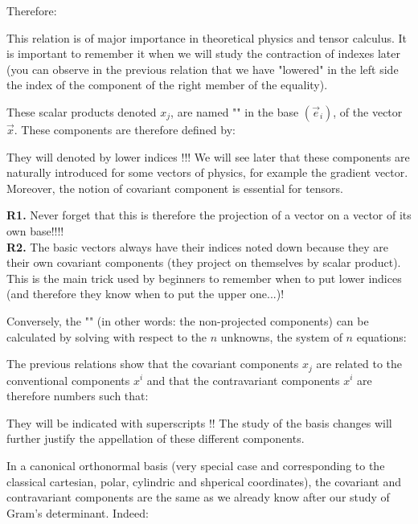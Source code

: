 	Therefore:
	
	This relation is of major importance in theoretical physics and tensor calculus. It is important to remember it when we will study the contraction of indexes later (you can observe in the previous relation that we have "lowered" in the left side the index of the component of the right member of the equality).
	
	These scalar products denoted $x_j$, are named "" in the base $(\vec{e}_i)$, of the vector $\vec{x}$. These components are therefore defined by:
	
	They will denoted by lower indices !!! We will see later that these components are naturally introduced for some vectors of physics, for example the gradient vector. Moreover, the notion of covariant component is essential for tensors.
	
	\begin{tcolorbox}[title=Remarks,colframe=black,arc=10pt]
	\textbf{R1.} Never forget that this is therefore the projection of a vector on a vector of its own base!!!!\\
	
	\textbf{R2.} The basic vectors always have their indices noted down because they are their own covariant components (they project on themselves by scalar product). This is the main trick used by beginners to remember when to put lower indices (and therefore they know when to put the upper one...)!
	\end{tcolorbox}
	Conversely, the "" (in other words: the non-projected components) can be calculated by solving with respect to the $n$ unknowns, the system of $n$ equations:
	
	The previous relations show that the covariant components $x_j$ are related to the conventional components $x^i$ and that the contravariant components $x^i$ are therefore numbers such that:
	
	They will be indicated with superscripts !! The study of the basis changes will further justify the appellation of these different components.
	
	In a canonical orthonormal basis (very special case and corresponding to the classical cartesian, polar, cylindric and shperical coordinates), the covariant and contravariant components are the same as we already know after our study of Gram's determinant. Indeed:
	
